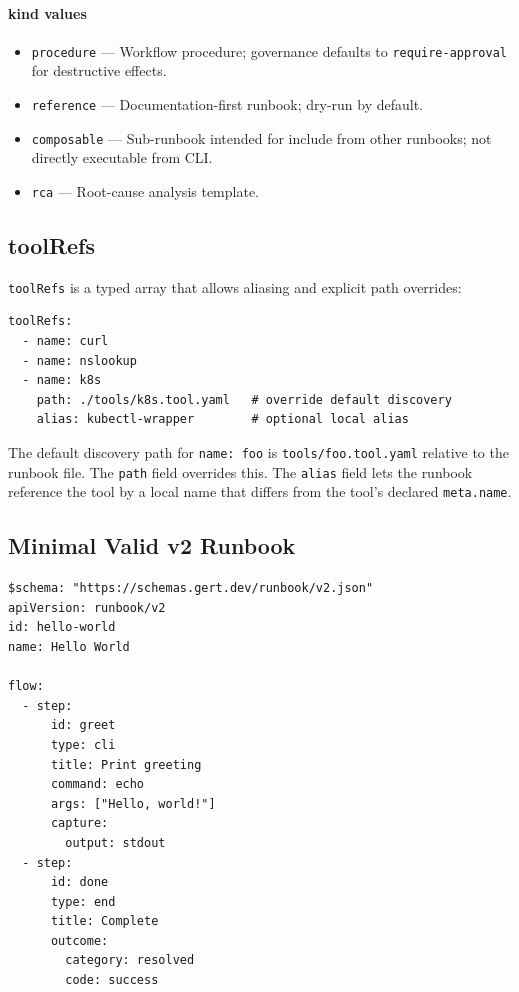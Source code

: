 \paragraph{kind values}
\begin{itemize}
  \item \texttt{procedure} --- Workflow procedure; governance defaults
        to \texttt{require-approval} for destructive effects.
  \item \texttt{reference} — Documentation-first runbook; dry-run by default.
  \item \texttt{composable} — Sub-runbook intended for include from other
        runbooks; not directly executable from CLI.
  \item \texttt{rca} — Root-cause analysis template.
\end{itemize}

\subsection{toolRefs}
\label{subsec:toolrefs}

\texttt{toolRefs} is a typed array that allows aliasing and explicit path
overrides:

\begin{verbatim}
toolRefs:
  - name: curl
  - name: nslookup
  - name: k8s
    path: ./tools/k8s.tool.yaml   # override default discovery
    alias: kubectl-wrapper        # optional local alias
\end{verbatim}

The default discovery path for \texttt{name: foo} is \texttt{tools/foo.tool.yaml}
relative to the runbook file.  The \texttt{path} field overrides this.
The \texttt{alias} field lets the runbook reference the tool by a local name
that differs from the tool's declared \texttt{meta.name}.

\subsection{Minimal Valid v2 Runbook}
\label{subsec:minimal-runbook}

\begin{verbatim}
$schema: "https://schemas.gert.dev/runbook/v2.json"
apiVersion: runbook/v2
id: hello-world
name: Hello World

flow:
  - step:
      id: greet
      type: cli
      title: Print greeting
      command: echo
      args: ["Hello, world!"]
      capture:
        output: stdout
  - step:
      id: done
      type: end
      title: Complete
      outcome:
        category: resolved
        code: success
\end{verbatim}

